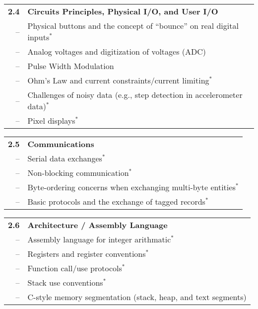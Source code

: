 \vspace{0.1in}
\noindent
\begin{tabular}{r l}
{\bf 2.4} & {\bf Circuits Principles, Physical I/O, and User I/O} \\
-- & Physical buttons and the concept of ``bounce'' on real digital inputs$^*$ \\
-- & Analog voltages and digitization of voltages (ADC) \\
-- & Pulse Width Modulation \\
-- & Ohm's Law and current constraints/current limiting$^*$ \\
-- & Challenges of noisy data (e.g., step detection in accelerometer data)$^*$ \\
-- & Pixel displays$^*$
\end{tabular}

\vspace{0.1in}
\noindent
\begin{tabular}{r l}
{\bf 2.5} & {\bf Communications} \\
-- & Serial data exchanges$^*$ \\
-- & Non-blocking communication$^*$ \\
-- & Byte-ordering concerns when exchanging multi-byte entities$^*$ \\
-- & Basic protocols and the exchange of tagged records$^*$
\end{tabular}

\vspace{0.1in}
\noindent
\begin{tabular}{r l}
{\bf 2.6} & {\bf Architecture / Assembly Language} \\
-- & Assembly language for integer arithmatic$^*$ \\
-- & Registers and register conventions$^*$ \\
-- & Function call/use protocols$^*$ \\
-- & Stack use conventions$^*$ \\
-- & C-style memory segmentation (stack, heap, and text segments)
\end{tabular}
